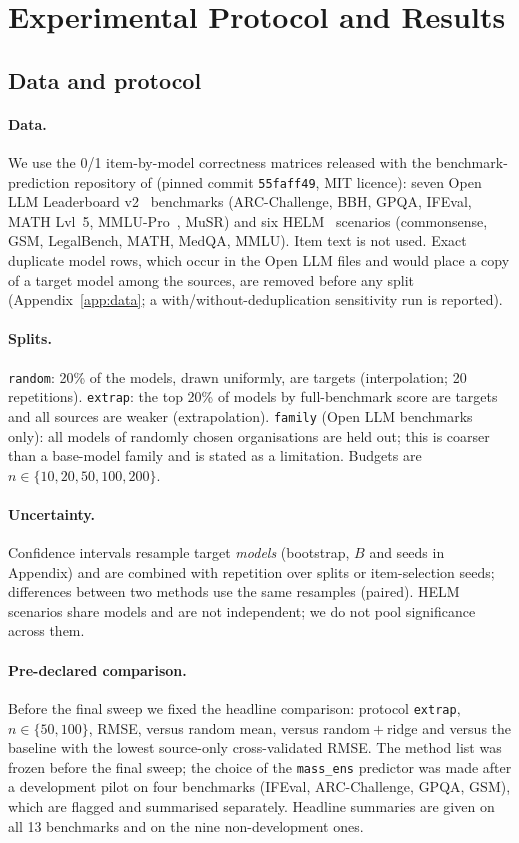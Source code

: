 \section{Experimental Protocol and Results}
\label{sec:exp}

\subsection{Data and protocol}
\label{sec:protocol}
\paragraph{Data.}
We use the 0/1 item-by-model correctness matrices released with the benchmark-prediction repository of \citet{zhang2025benchmark} (pinned commit \texttt{55faff49}, MIT licence): seven Open LLM Leaderboard v2~\citep{fourrier2024oll} benchmarks (ARC-Challenge, BBH, GPQA, IFEval, MATH Lvl~5, MMLU-Pro~\citep{wang2024mmlupro}, MuSR) and six HELM~\citep{liang2023helm} scenarios (commonsense, GSM, LegalBench, MATH, MedQA, MMLU). Item text is not used.
Exact duplicate model rows, which occur in the Open LLM files and would place a copy of a target model among the sources, are removed before any split (Appendix~\ref{app:data}; a with/without-deduplication sensitivity run is reported).
\paragraph{Splits.}
\texttt{random}: 20\% of the models, drawn uniformly, are targets (interpolation; 20 repetitions). \texttt{extrap}: the top 20\% of models by full-benchmark score are targets and all sources are weaker (extrapolation). \texttt{family} (Open LLM benchmarks only): all models of randomly chosen organisations are held out; this is coarser than a base-model family and is stated as a limitation. Budgets are $n\in\{10,20,50,100,200\}$.
\paragraph{Uncertainty.}
Confidence intervals resample target \emph{models} (bootstrap, $B$ and seeds in Appendix) and are combined with repetition over splits or item-selection seeds; differences between two methods use the same resamples (paired). HELM scenarios share models and are not independent; we do not pool significance across them.
\paragraph{Pre-declared comparison.}
Before the final sweep we fixed the headline comparison: protocol \texttt{extrap}, $n\in\{50,100\}$, RMSE, \mass{} versus random mean, versus random${}+{}$ridge and versus the baseline with the lowest source-only cross-validated RMSE. The method list was frozen before the final sweep; the choice of the \texttt{mass\_ens} predictor was made after a development pilot on four benchmarks (IFEval, ARC-Challenge, GPQA, GSM), which are flagged and summarised separately. Headline summaries are given on all 13 benchmarks and on the nine non-development ones.

